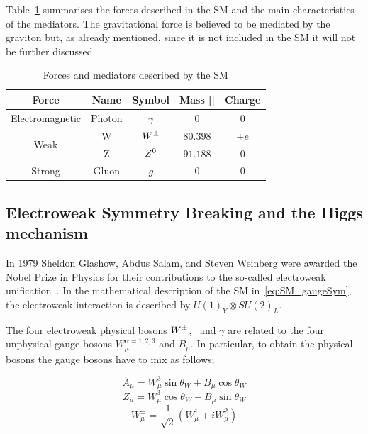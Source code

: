 			Table~\ref{tab:interactions} summarises the forces described in the \ac{SM} and the main characteristics of the mediators. The gravitational force is believed to be mediated by the graviton but, as already mentioned, since it is not included in the \ac{SM} it will not be further discussed.

			\begin{table}[!htb]\centering\caption{Forces and mediators described by the \ac{SM}}							
				\begin{tabular}{ccccc}
					\toprule
					\textbf{Force} & \textbf{Name} & \textbf{Symbol} & \textbf{Mass} [\GeV]& \textbf{Charge} \\ 
					\toprule
					Electromagnetic & Photon & $\gamma$ & 0 & 0 \\ \midrule
					\multirow{2}{*}{Weak} & W & $W^{\pm}$ & $80.398$ & $\pm e$ \\
					& Z & $Z^0$ & $91.188$ & 0 \\\midrule
					Strong & Gluon & $g$ & $0$ & $0$ \\\bottomrule
				\end{tabular}						
			\label{tab:interactions} 
			\end{table}


		\subsection{Electroweak Symmetry Breaking and the Higgs mechanism}
		\label{sec:ewksb}

			In 1979 Sheldon Glashow, Abdus Salam, and Steven Weinberg were awarded the Nobel Prize in Physics for their contributions to the so-called electroweak unification~\cite{Glashow:1961tr,SALAM1964168,PhysRevLett.19.1264}. In the mathematical description of the \ac{SM} in~\ref{eq:SM_gaugeSym}, the electroweak interaction is described by $U(1)_Y \otimes SU(2)_L$. 

			The four electroweak physical bosons $W^{\pm}$, \Zboson\ and $\gamma$ are related to the four unphysical gauge bosons $W_{\mu}^{\alpha = 1,2,3}$ and $B_\mu$. In particular, to obtain the physical bosons the gauge bosons have to mix as follows;

			\begin{equation}
			\label{eq:photon}
				A_{\mu} = W_{\mu}^3 \sin\theta_W  + B_{\mu}\cos \theta_W 
			\end{equation}
			\begin{equation}
			\label{eq:Zboson}
				Z_{\mu} = W_{\mu}^3\cos\theta_W  - B_{\mu} \sin \theta_W
			\end{equation}
			\begin{equation}
			\label{eq:Wboson}
				W_{\mu}^\pm = \frac{1}{\sqrt{2}} \displaystyle \left ( W_{\mu}^1 \mp i W_{\mu}^2 \right )
			\end{equation}

